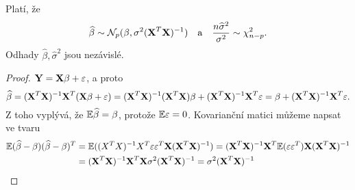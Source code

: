 \begin{theorem}
Platí, že
$$\widehat{\beta}\sim \mathcal{N}_p(\beta,\sigma^2(\textbf{X}^T\textbf{X})^{-1})\quad \text{a} \quad \frac{n\widehat{\sigma}^2}{\sigma^2}\sim \chi^2_{n-p}.$$
Odhady $\widehat{\beta}, \widehat{\sigma}^2$ jsou nezávislé.
\begin{proof}
$\textbf{Y}=\textbf{X}\beta+\varepsilon$, a proto
$$\widehat{\beta}=(\textbf{X}^T\textbf{X})^{-1}\textbf{X}^T(\textbf{X}\beta+\varepsilon)=(\textbf{X}^T\textbf{X})^{-1}(\textbf{X}^T\textbf{X})\beta +(\textbf{X}^T\textbf{X})^{-1}\textbf{X}^T\varepsilon=\beta+(\textbf{X}^T\textbf{X})^{-1}\textbf{X}^T\varepsilon.$$
Z toho vyplývá, že $\mathbb{E}{\widehat{\beta}}=\beta$, protože $\mathbb{E}{\varepsilon}=0 $.
Kovarianční matici můžeme napsat ve tvaru
\begin{align*}
\mathbb{E}{(\widehat{\beta}-\beta)(\widehat{\beta}-\beta)^T}&=\mathbb{E}((X^TX)^{-1}X^T\varepsilon\varepsilon^T\textbf{X}(\textbf{X}^T\textbf{X})^{-1})=(\textbf{X}^T\textbf{X})^{-1}\textbf{X}^T\mathbb{E}(\varepsilon\varepsilon^T)\textbf{X}(\textbf{X}^T\textbf{X})^{-1}\\
&=(\textbf{X}^T\textbf{X})^{-1}\textbf{X}^T\textbf{X}\sigma^2(\textbf{X}^T\textbf{X})^{-1} =\sigma^2(\textbf{X}^T\textbf{X})^{-1}
\end{align*}

\end{proof}
\end{theorem}
